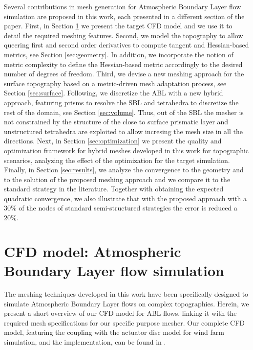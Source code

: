 \documentclass[1p]{elsarticle}
\begin{document}
Several contributions in mesh generation for Atmospheric Boundary Layer flow simulation are proposed in this work, each presented in a different section of the paper.
First, in Section \ref{sec:cfd} we present the target CFD model and we use it to detail the required meshing features.
Second,  we model the topography to allow queering first and second order derivatives to compute tangent and Hessian-based metrics, see Section \ref{sec:geometry}.
In addition, we incorporate the notion of metric complexity to define the Hessian-based metric accordingly to the desired number of degrees of freedom.
Third, we devise a new meshing approach for the surface topography based on a metric-driven mesh adaptation process, see Section \ref{sec:surface}.
Following, we discretize the ABL with a new hybrid approach, featuring prisms to resolve the SBL and tetrahedra to discretize the rest of the domain, see  Section \ref{sec:volume}.
Thus, out of the SBL the mesher is not constrained by the structure of the close to surface prismatic layer and unstructured tetrahedra are exploited to allow incresing the mesh size in all the directions.
Next, in Section \ref{sec:optimization} we present the quality and optimization framework for hybrid meshes developed in this work for topographic scenarios, analyzing the effect of the optimization for the target simulation.
Finally,   in Section \ref{sec:results}, we analyze the convergence to the geometry and to the solution of the proposed meshing approach and we compare it  to the standard strategy in the literature.
Together with obtaining the expected quadratic convergence, we also illustrate that with the proposed approach with a 30\% of the nodes of standard semi-structured strategies the error is reduced a 20\%.



\section{CFD model: Atmospheric Boundary Layer flow simulation}
\label{sec:cfd}
The meshing techniques developed in this work have been specifically designed to simulate Atmospheric Boundary Layer flows on complex topographies. 
Herein, we present a short overview of our CFD model for ABL flows, linking it with the required mesh specifications for our specific purpose mesher. 
Our complete CFD model, featuring the coupling with the actuator disc model for wind farm simulation, and the implementation, can be found in \cite{avila:CFDframworkWindFarms, Diaz2018}. 
\end{document}
